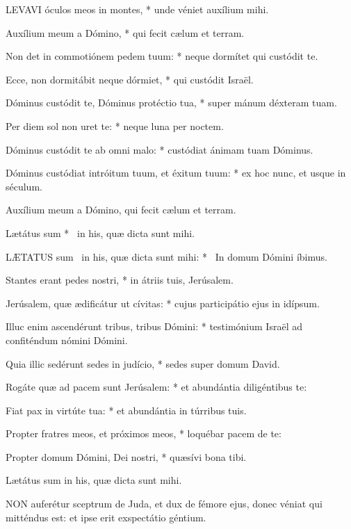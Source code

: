 
\lettrine[lines=2]{L}{EVAVI} óculos meos in montes, * unde véniet auxílium mihi.

Auxílium meum a Dómino, * qui fecit cælum et terram.

Non det in commotiónem pedem tuum: * neque dormítet qui custódit te.

Ecce, non dormitábit neque dórmiet, * qui custódit Israël.

Dóminus custódit te, Dóminus protéctio tua, * super mánum déxteram tuam.

Per diem sol non uret te: * neque luna per noctem.

Dóminus custódit te ab omni malo: * custódiat ánimam tuam Dóminus.

Dóminus custódiat intróitum tuum, et éxitum tuum: * ex hoc nunc, et usque in séculum.

 Auxílium meum a Dómino, qui fecit cælum et terram.

 Lætátus sum * \textdagger\ in his, quæ dicta sunt mihi. \textdaggerdbl


\lettrine[lines=2]{L}{ÆTATUS} sum \textdagger\ in his, quæ dicta sunt mihi: * \textdaggerdbl\ In domum Dómini íbimus.

Stantes erant pedes nostri, * in átriis tuis, Jerúsalem.

Jerúsalem, quæ ædificátur ut cívitas: * cujus participátio ejus in idípsum.

Illuc enim ascendérunt tribus, tribus Dómini: * testimónium Israël ad confiténdum nómini Dómini.

Quia illic sedérunt sedes in judício, * sedes super domum David.

Rogáte quæ ad pacem sunt Jerúsalem: * et abundántia diligéntibus te:

Fiat pax in virtúte tua: * et abundántia in túrribus tuis.

Propter fratres meos, et próximos meos, * loquébar pacem de te:

Propter domum Dómini, Dei nostri, * quæsívi bona tibi.

 Lætátus sum in his, quæ dicta sunt mihi.



\lettrine[lines=2]{N}{ON} auferétur sceptrum de Juda, et dux de fémore ejus, donec véniat qui mitténdus est: et ipse erit exspectátio géntium.

